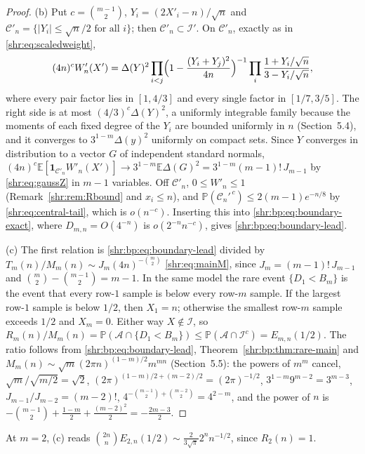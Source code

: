 \documentclass[11pt,letterpaper]{article}
\numberwithin{equation}{section}
\theoremstyle{definition}
\newcommand{\E}{\mathbb E}
\newcommand{\Pp}{\mathbb P}
\newcommand{\1}{\mathbf 1}
\newcommand{\ind}{\mathbf 1}
\begin{document}
\begin{proof}
(b) Put $c=\binom{m-1}2$, $Y_i=(2X'_i-n)/\sqrt n$ and
$\mathcal C'_n=\{|Y_i|\le\sqrt n/2\text{ for all }i\}$; then
$\mathcal C'_n\subset\mathcal I'$. On $\mathcal C'_n$, exactly as in
\eqref{shr:eq:scaledweight},
\[
 (4n)^cW'_n(X')=\Delta(Y)^2
 \prod_{i<j}\Bigl(1-\frac{(Y_i+Y_j)^2}{4n}\Bigr)^{-1}
 \prod_{i}\frac{1+Y_i/\sqrt n}{3-Y_i/\sqrt n},
\]
where every pair factor lies in $[1,4/3]$ and every single factor in
$[1/7,3/5]$. The right side is at most $(4/3)^c\Delta(Y)^2$, a uniformly
integrable family because the moments of each fixed degree of the $Y_i$
are bounded uniformly in $n$ (Section~5.4), and it converges to
$3^{1-m}\Delta(y)^2$ uniformly on compact sets. Since $Y$ converges in
distribution to a vector $G$ of independent standard normals,
$(4n)^c\E[\ind_{\mathcal C'_n}W'_n(X')]\to3^{1-m}\E\Delta(G)^2
=3^{1-m}(m-1)!\,J_{m-1}$ by \eqref{shr:eq:gaussZ} in $m-1$ variables.
Off $\mathcal C'_n$, $0\le W'_n\le1$ (Remark~\ref{shr:rem:Rbound} and
$x_i\le n$), and $\Pp(\mathcal C_n'^{\,c})\le2(m-1)e^{-n/8}$ by
\eqref{shr:eq:central-tail}, which is $o(n^{-c})$. Inserting this into
\eqref{shr:bp:eq:boundary-exact}, where $D_{m,n}=O(4^{-n})$ is
$o(2^{-n}n^{-c})$, gives \eqref{shr:bp:eq:boundary-lead}.

(c) The first relation is \eqref{shr:bp:eq:boundary-lead} divided by
$T_m(n)/M_m(n)\sim J_m(4n)^{-\binom m2}$ \eqref{shr:eq:mainM}, since
$J_m=(m-1)!\,J_{m-1}$ and $\binom m2-\binom{m-1}2=m-1$. In the same model
the rare event $\{D_1<B_m\}$ is the event that every row-$1$ sample is
below every row-$m$ sample. If the largest row-$1$ sample is below $1/2$,
then $X_1=n$; otherwise the smallest row-$m$ sample exceeds $1/2$ and
$X_m=0$. Either way $X\notin\mathcal I$, so
$R_m(n)/M_m(n)=\Pp(\mathcal A\cap\{D_1<B_m\})
\le\Pp(\mathcal A\cap\mathcal I^c)=E_{m,n}(1/2)$. The ratio follows from
\eqref{shr:bp:eq:boundary-lead}, Theorem~\ref{shr:bp:thm:rare-main} and
$M_m(n)\sim\sqrt m(2\pi n)^{(1-m)/2}m^{mn}$ (Section~5.5): the powers of
$m^m$ cancel, $\sqrt m/\sqrt{m/2}=\sqrt2$,
$(2\pi)^{(1-m)/2+(m-2)/2}=(2\pi)^{-1/2}$, $3^{1-m}9^{m-2}=3^{m-3}$,
$J_{m-1}/J_{m-2}=(m-2)!$, $4^{-\binom{m-1}2+\binom{m-2}2}=4^{2-m}$, and the
power of $n$ is $-\binom{m-1}2+\frac{1-m}2+\frac{(m-2)^2}2=-\frac{2m-3}2$.
\end{proof}

At $m=2$, (c) reads $\binom{2n}nE_{2,n}(1/2)\sim\frac{2}{3\sqrt\pi}2^n
n^{-1/2}$, since $R_2(n)=1$.
\end{document}
